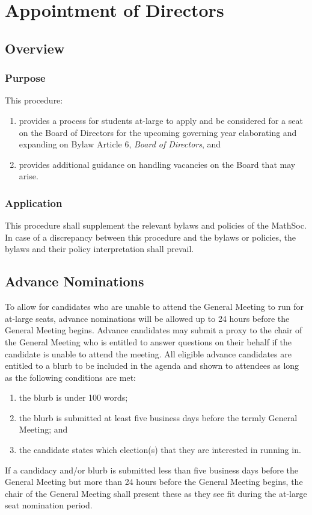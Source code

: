 
\section{Appointment of Directors}
\subsection{Overview}
\subsubsection{Purpose}
This procedure:
\begin{enumerate}
	\item provides a process for students at-large to apply and be considered for a seat on the
	      Board of Directors for the upcoming governing year elaborating and expanding on Bylaw Article 6,
	      \textit{Board of Directors}, and
	\item provides additional guidance on handling vacancies on the Board that may arise.
\end{enumerate}

\subsubsection{Application}
This procedure shall supplement the relevant bylaws and policies of the MathSoc.
In case of a discrepancy between this procedure and the bylaws or policies, the bylaws and their policy interpretation shall prevail.

\subsection{Advance Nominations}
To allow for candidates who are unable to attend the General Meeting to run for at-large seats, advance nominations will be allowed up to 24 hours before the General Meeting begins.
Advance candidates may submit a proxy to the chair of the General Meeting who is entitled to answer questions on their behalf if the candidate is unable to attend the meeting.
All eligible advance candidates are entitled to a blurb to be included in the agenda and shown to attendees as long as the following conditions are met:
\begin{enumerate}
	\item the blurb is under 100 words;
	\item the blurb is submitted at least five business days before the termly General Meeting; and
	\item the candidate states which election(s) that they are interested in running in.
\end{enumerate}
If a candidacy and/or blurb is submitted less than five business days before the General Meeting but more than 24 hours before the General Meeting begins, the chair of the General Meeting shall present these as they see fit during the at-large seat nomination period.

